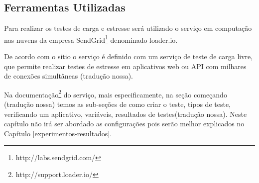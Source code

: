 




\subsection{Ferramentas Utilizadas}
\label{ferramentas-utilizadas-para-testes}
  
  Para realizar os testes de carga e estresse será utilizado o serviço em computação nas nuvens
  da empresa SendGrid\footnote{http://labs.sendgrid.com/} denominado loader.io.
  
  De acordo com o sitio o serviço é definido com um serviço de teste de carga livre,
  que permite realizar testes de estresse em aplicativos web ou \ac{API} com milhares de conexões simultâneas
  (tradução nossa).
  
  Na documentação\footnote{http://support.loader.io/} do serviço, mais especificamente, na seção começando (tradução nossa)
  temos as sub-seções de como criar o teste, tipos de teste, verificando um aplicativo, variáveis,
  resultados de testes(tradução nossa). Neste capítulo não irá ser abordado as configurações pois serão melhor explicados
  no Capítulo \ref{experimentos-resultados}.